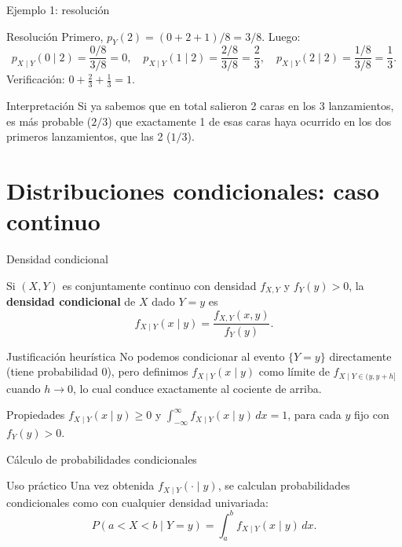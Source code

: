 \documentclass[aspectratio=169,11pt]{beamer}
\begin{document}
\begin{frame}{Ejemplo 1: resolución}
\begin{block}{Resolución}
Primero, $p_Y(2) = (0+2+1)/8 = 3/8$. Luego:
\[
p_{X\mid Y}(0\mid 2) = \frac{0/8}{3/8} = 0, \quad
p_{X\mid Y}(1\mid 2) = \frac{2/8}{3/8} = \frac23, \quad
p_{X\mid Y}(2\mid 2) = \frac{1/8}{3/8} = \frac13.
\]
Verificación: $0 + \tfrac23 + \tfrac13 = 1$. \checkmark
\end{block}
\pause
\begin{alertblock}{Interpretación}
Si ya sabemos que en total salieron 2 caras en los 3 lanzamientos, es más probable ($2/3$) que exactamente 1 de esas caras haya ocurrido en los dos primeros lanzamientos, que las 2 ($1/3$).
\end{alertblock}
\end{frame}

\section{Distribuciones condicionales: caso continuo}

\begin{frame}{Densidad condicional}
\begin{definition}
Si $(X,Y)$ es conjuntamente continuo con densidad $f_{X,Y}$ y $f_Y(y) > 0$, la \textbf{densidad condicional} de $X$ dado $Y=y$ es
\[
f_{X\mid Y}(x\mid y) = \frac{f_{X,Y}(x,y)}{f_Y(y)}.
\]
\end{definition}
\begin{block}{Justificación heurística}
No podemos condicionar al evento $\{Y=y\}$ directamente (tiene probabilidad 0), pero definimos $f_{X\mid Y}(x\mid y)$ como límite de $f_{X\mid Y \in (y,y+h]}$ cuando $h\to 0$, lo cual conduce exactamente al cociente de arriba.
\end{block}
\begin{block}{Propiedades}
$f_{X\mid Y}(x\mid y)\ge 0$ y $\displaystyle\int_{-\infty}^{\infty} f_{X\mid Y}(x\mid y)\,dx = 1$, para cada $y$ fijo con $f_Y(y)>0$.
\end{block}
\end{frame}

\begin{frame}{Cálculo de probabilidades condicionales}
\begin{block}{Uso práctico}
Una vez obtenida $f_{X\mid Y}(\cdot \mid y)$, se calculan probabilidades condicionales como con cualquier densidad univariada:
\[
P(a < X < b \mid Y=y) = \int_a^b f_{X\mid Y}(x\mid y)\, dx.
\]
\end{block}
\end{frame}
\end{document}

